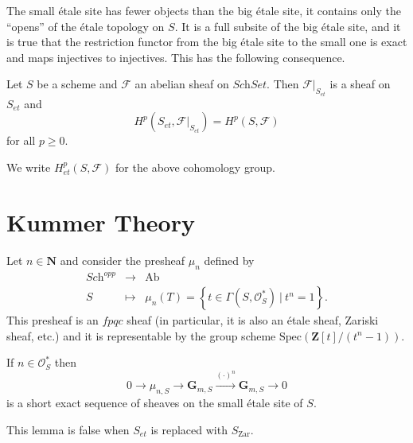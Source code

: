 \noindent
The small \'etale site has fewer objects than the big \'etale site, it contains 
only the ``opens'' of the \'etale topology on $S$. It is a full subsite of the 
big \'etale site, and it is true that the restriction functor from the big 
\'etale site to the small one is exact and maps injectives to injectives. This 
has the following consequence.

\begin{proposition}
Let $S$ be a scheme and $\mathcal{F}$ an abelian sheaf on $\textit{Sch}Set$. 
Then $\mathcal{F}|_{S_{et}}$ is a sheaf on $S_{et}$ and 
$$
H^p(S_{et}, \mathcal{F}|_{S_{et}}) = H^p(S, \mathcal{F}) 
$$
for all $p \geq 0$. 
\end{proposition}

\noindent
We write $H_{et}^p(S,\mathcal{F})$ for the above cohomology group.

\section{Kummer Theory}
\label{section-kummer}

\noindent
Let $n \in \mathbf{N}$ and consider the presheaf $\mu_n$ defined by
$$
\begin{array}{ccl}
\textit{Sch}^{opp} & \longrightarrow  & \text{Ab} \\
S & \longmapsto &  \mu_n(T) =  \left\{t \in \Gamma(S, \mathcal{O}_S^*) \  | \ 
t^n = 1 \right\}.
\end{array}
$$
This presheaf is an $fpqc$ sheaf (in particular, it is also an \'etale sheaf, 
Zariski sheaf, etc.) and it is representable by the group scheme $\text{Spec} 
(\mathbf{Z}[t]/(t^n-1))$. 

\begin{lemma} \label{lem:KummerSequence}
If $n\in \mathcal{O}_S^*$ then 
$$
0\to \mu_{n, S} \to \mathbf{G}_{m, S} \xrightarrow{(\cdot)^n} \mathbf{G}_{m, 
S}\to 0
$$
is a short exact sequence of sheaves on the small \'etale site of  $S$. 
\end{lemma}

\begin{remark}
This lemma is false when $S_{et}$ is replaced with $S_\mathrm{Zar}$.
\end{remark}

